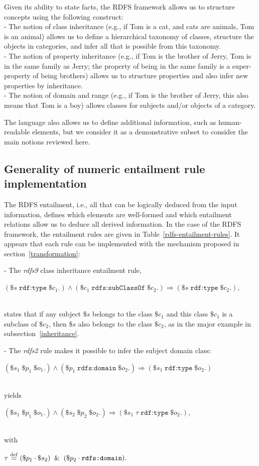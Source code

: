\documentclass[sn-mathphys]{sn-jnl}
\newcommand{\defq}{\stackrel {\rm def}{=}}
\newcommand{\eqline}[1]{~\vspace{0.1cm}\\\centerline{$#1$}\vspace{0.1cm}\\}
\begin{document}
\begin{appendices}
Given its ability to state facts, the RDFS framework allows us to structure concepts using the following construct:
\\ - The notion of class inheritance (e.g., if Tom is a cat, and cats are animals, Tom is an animal) allows us to define a hierarchical taxonomy of classes, structure the objects in categories, and infer all that is possible from this taxonomy.
\\ - The notion of property inheritance (e.g., if Tom is the brother of Jerry, Tom is in the same family as Jerry; the property of being in the same family is a super-property of being brothers) allows us to structure properties and also infer new properties by inheritance.
\\ - The notion of domain and range (e.g., if Tom is the brother of Jerry, this also means that Tom is a boy) allows classes for subjects and/or objects of a category.

The language also allows us to define additional information, such as human-readable elements, but we consider it as a demonstrative subset to consider the main notions reviewed here.

\subsection*{Generality of numeric entailment rule implementation} \label{RDFS-entailment-rules-2}

The RDFS entailment, i.e., all that can be logically deduced from the input information, defines which elements are well-formed and which entailment relations allow us to deduce all derived information. In the case of the RDFS framework, the entailment rules are given in Table~\ref{rdfs-entailment-rules}. It appears that each rule can be implemented with the mechanism proposed in section~\ref{transformation}:

- The \textit{rdfs9}  class inheritance entailment rule,
\eqline{(\$s \; \texttt{rdf:type} \; \$c_1 .) \wedge (\$c_1 \; \texttt{rdfs:subClassOf} \; \$c_2 .) \Rightarrow (\$s \; \texttt{rdf:type} \; \$c_2 .),}
states that if any subject $\$s$ belongs to the class $\$c_1$ and this class $\$c_1$ is a subclass of $\$c_2$, then $\$s$ also belongs to the class $\$c_2$, as in the major example in subsection~\ref{inheritance}.

- The \textit{rdfs2} rule makes it possible to infer the subject domain class:
\eqline{(\$s_1 \; \$p_1 \; \$o_1 .) \wedge (\$p_1 \; \texttt{rdfs:domain} \; \$o_2 .) \Rightarrow (\$s_1 \; \texttt{rdf:type} \; \$o_2 .)}
yields
\eqline{(\$s_1 \; \$p_1 \; \$o_1 .) \wedge (\$s_2 \; \$p_2 \; \$o_2 .) \Rightarrow (\$s_1 \; \tau \; \texttt{rdf:type} \; \$o_2 .),}
with
\eqline{\tau \defq (\$p_1 \cdot \$s_2) \And (\$p_2 \cdot \texttt{rdfs:domain}).}


\end{appendices}
\end{document}
